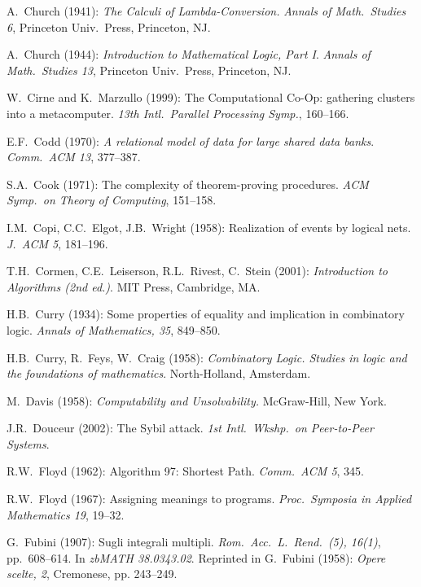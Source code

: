 \begin{thebibliography}{999}
A.~Church (1941):
{\it The Calculi of Lambda-Conversion.}
{\it Annals of Math.~Studies 6}, Princeton Univ.~Press, Princeton, NJ.

A.~Church (1944):
{\it Introduction to Mathematical Logic, Part I}.
{\it Annals of Math.~Studies 13}, Princeton Univ.~Press, Princeton, NJ.

W.~Cirne and K.~Marzullo (1999): The Computational Co-Op: gathering
clusters into a metacomputer.  {\it 13th Intl.~Parallel Processing
Symp.}, 160--166.

E.F.~Codd (1970):  {\it A relational model of data for large shared
data banks}.  {\it Comm.~ACM 13}, 377--387.

S.A.~Cook (1971): The complexity of theorem-proving procedures.  {\it
ACM Symp.~on Theory of Computing}, 151--158.

I.M.~Copi, C.C.~Elgot, J.B.~Wright (1958): Realization of events by
logical nets.  {\it J.~ACM 5}, 181--196.

T.H.~Cormen, C.E.~Leiserson, R.L.~Rivest, C.~Stein (2001):
{\it Introduction to Algorithms (2nd ed.)}.
MIT Press, Cambridge, MA.

H.B.~Curry (1934): Some properties of equality and implication in
combinatory logic.  {\it Annals of Mathematics, 35}, 849--850.

H.B.~Curry, R.~Feys, W.~Craig (1958):
{\it Combinatory Logic.  Studies in logic and the foundations of
mathematics}.  North-Holland, Amsterdam.


M.~Davis (1958):
{\it Computability and Unsolvability.}
McGraw-Hill, New York.

J.R.~Douceur (2002): The Sybil attack.  {\it 1st Intl.~Wkshp.~on
Peer-to-Peer Systems}.


R.W.~Floyd (1962): Algorithm 97: Shortest Path.  {\it Comm.~ACM 5}, 345.

R.W.~Floyd (1967): Assigning meanings to programs.  {\it
Proc.~Symposia in Applied Mathematics 19}, 19--32.

G.~Fubini (1907): Sugli integrali multipli.
{\it Rom.~Acc.~L.~Rend.~(5), 16(1)}, pp.~608–614.  In {\it zbMATH
  38.0343.02}.  Reprinted in
G.~Fubini (1958): {\it Opere scelte, 2}, Cremonese, pp. 243–249.


\end{thebibliography}
